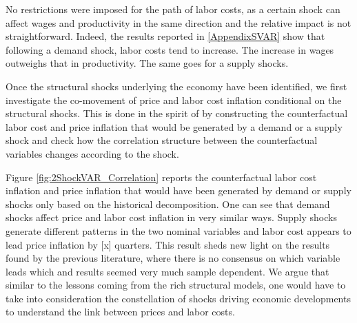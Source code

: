 \documentclass[11pt]{article}
\begin{document}
No restrictions were imposed for the path of labor costs, as a certain shock can affect wages and productivity in the same direction and the relative impact is not straightforward. Indeed, the results reported in \ref{AppendixSVAR} show that following a demand shock, labor costs tend to increase. The increase in wages outweighs that in productivity. The same goes for a supply shocks.   

Once the structural shocks underlying the economy have been identified, we first investigate the co-movement of price and labor cost inflation conditional on the structural shocks. This is done in the spirit of \cite{Gali_99} by constructing the counterfactual labor cost and price inflation that would be generated by a demand or a supply shock and check how the correlation structure between the counterfactual variables changes according to the shock. 

Figure \ref{fig:2ShockVAR_Correlation} reports the counterfactual labor cost inflation and price inflation that would have been generated by demand or supply shocks only based on the historical decomposition. One can see that demand shocks affect price and labor cost inflation in very similar ways. Supply shocks generate different patterns in the two nominal variables and labor cost appears to lead price inflation by [x] quarters. This result sheds new light on the results found by the previous literature, where there is no consensus on which variable leads which and results seemed very much sample dependent. We argue that similar to the lessons coming from the rich structural models, one would have to take into consideration the constellation of shocks driving economic developments to understand the link between prices and labor costs.
\end{document}
